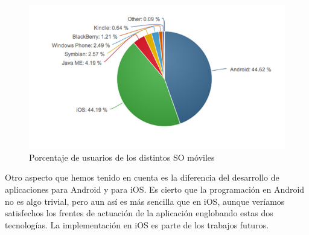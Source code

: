\begin{figure}[H]

\centering
\includegraphics[scale=0.5]{./android/imagenes/porcentaje.jpg}
\caption{Porcentaje de usuarios de los distintos SO móviles}
\label{porcentajesandroid}
\end{figure}




Otro aspecto que hemos tenido en cuenta es la diferencia del desarrollo de aplicaciones para Android y para iOS. Es cierto que la programación en Android no es algo trivial, pero aun así es más sencilla que en iOS, aunque veríamos satisfechos los frentes de actuación de la aplicación englobando estas dos tecnologías. La implementación en iOS es parte de los trabajos futuros.


